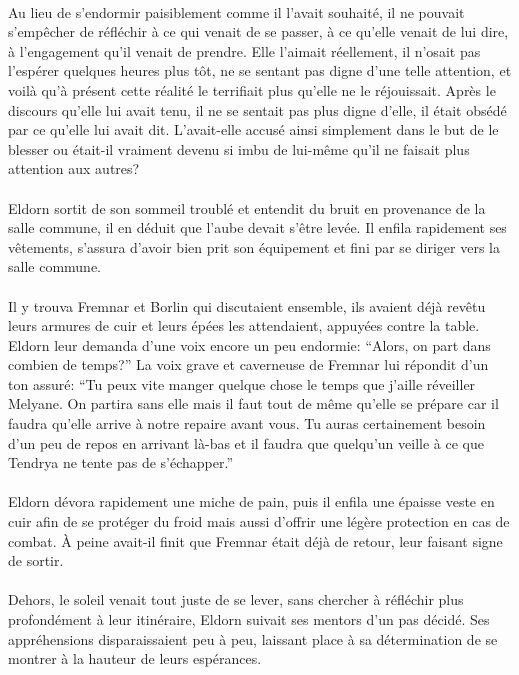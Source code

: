 \paragraph{}
Au lieu de s'endormir paisiblement comme il l'avait souhaité, il ne pouvait
s'empêcher de réfléchir à ce qui venait de se passer, à ce qu'elle venait de
lui dire, à l'engagement qu'il venait de prendre. Elle l'aimait réellement, il
n'osait pas l'espérer quelques heures plus tôt, ne se sentant pas digne d'une
telle attention, et voilà qu'à présent cette réalité le terrifiait plus
qu'elle ne le réjouissait. Après le discours qu'elle lui avait tenu, il ne
se sentait pas plus digne d'elle, il était obsédé par ce qu'elle lui avait
dit. L'avait-elle accusé ainsi simplement dans le but de le blesser ou
était-il vraiment devenu si imbu de lui-même qu'il ne faisait plus attention
aux autres?

\contextswitch

\paragraph{}
Eldorn sortit de son sommeil troublé et entendit du bruit en provenance de la
salle commune, il en déduit que l'aube devait s'être levée. Il enfila
rapidement ses vêtements, s'assura d'avoir bien prit son équipement et fini
par se diriger vers la salle commune.

\paragraph{}
Il y trouva Fremnar et Borlin qui discutaient ensemble, ils avaient déjà
revêtu leurs armures de cuir et leurs épées les attendaient, appuyées contre
la table. Eldorn leur demanda d'une voix encore un peu endormie: ``Alors, on
part dans combien de temps?'' La voix grave et caverneuse de Fremnar lui
répondit d'un ton assuré: ``Tu peux vite manger quelque chose le temps que
j'aille réveiller Melyane. On partira sans elle mais il faut tout de même
qu'elle se prépare car il faudra qu'elle arrive à notre repaire avant vous. Tu
auras certainement besoin d'un peu de repos en arrivant là-bas et il faudra
que quelqu'un veille à ce que Tendrya ne tente pas de s'échapper.''

\paragraph{}
Eldorn dévora rapidement une miche de pain, puis il enfila une épaisse veste
en cuir afin de se protéger du froid mais aussi d'offrir une légère protection
en cas de combat. À peine avait-il finit que Fremnar était déjà de retour,
leur faisant signe de sortir.

\paragraph{}
Dehors, le soleil venait tout juste de se lever, sans chercher à réfléchir
plus profondément à leur itinéraire, Eldorn suivait ses mentors d'un pas
décidé. Ses appréhensions disparaissaient peu à peu, laissant place à sa
détermination de se montrer à la hauteur de leurs espérances.

\contextswitch